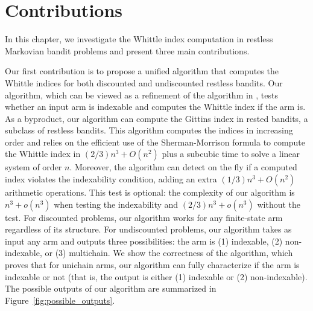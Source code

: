 \section{Contributions}
\label{ch:cpt:sec:contribute}

In this chapter, we investigate the Whittle index computation in restless Markovian bandit problems and present three main contributions. 

Our first contribution is to propose a unified algorithm that computes the Whittle indices for both discounted and undiscounted restless bandits. Our algorithm, which can be viewed as a refinement of the algorithm in \cite{akbarzadeh2020conditions}, tests whether an input arm is indexable and computes the Whittle index if the arm is. As a byproduct, our algorithm can compute the Gittins index in rested bandits, a subclass of restless bandits. This algorithm computes the indices in increasing order and relies on the efficient use of the Sherman-Morrison formula to compute the Whittle index in $(2/3)n^3 + O(n^2)$ plus a subcubic time \cite{strassen1969gaussian} to solve a linear system of order $n$.
Moreover, the algorithm can detect on the fly if a computed index violates the indexability condition, adding an extra $(1/3)n^3+O(n^2)$ arithmetic operations. This test is optional: the complexity of our algorithm is $n^3+o(n^3)$ when testing the indexability and $(2/3)n^3 +o(n^3)$ without the test. For discounted problems, our algorithm works for any finite-state arm regardless of its structure. For undiscounted problems, our algorithm takes as input any arm and outputs three possibilities: the arm is (1) indexable, (2) non-indexable, or (3) multichain. %
We show the correctness of the algorithm, which proves that for unichain arms, our algorithm can fully characterize if the arm is indexable or not (that is, the output is either (1) indexable or (2) non-indexable). The possible outputs of our algorithm are summarized in Figure~\ref{fig:possible_outputs}.

